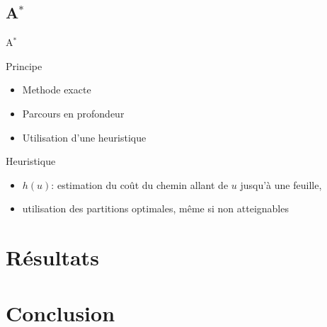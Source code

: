 \documentclass[tikz]{beamer}
\begin{document}
\subsection{A\(^*\)}
\begin{frame}[c]{A\(^*\)}
  \begin{block}{Principe}
    \begin{itemize}
      \item Methode exacte
      \item Parcours en profondeur
      \item Utilisation d'une heuristique
    \end{itemize}
  \end{block}
  \begin{block}{Heuristique}
    \begin{itemize}
      \item \(h(u)\): estimation du coût du chemin allant de \(u\)
        jusqu'à une feuille,
      \item utilisation des partitions optimales, même si non atteignables
    \end{itemize}
  \end{block}
\end{frame}

\section{Résultats}

\section*{Conclusion}
\end{document}
